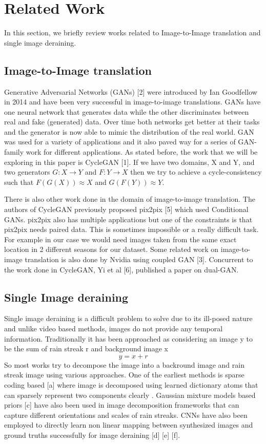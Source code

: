 \documentclass{article}
\begin{document}
\section{Related Work}
\label{gen_inst}

In this section, we briefly review works related to Image-to-Image translation and single image deraining.

\subsection{Image-to-Image translation}

Generative Adversarial Networks (GANs) [2] were introduced by  Ian Goodfellow in 2014 and have been very successful in image-to-image translations. GANs have one neural network that generates data while the other discriminates between real and fake (generated) data. Over time both networks get better at their tasks and the generator is now able to mimic the distribution of the real world. GAN was used for a variety of applications and it also paved way for a series of GAN-family work for different applications. As stated before, the work that we will be exploring in this paper is CycleGAN [1]. If we have two domains, X and Y, and two generators $G: X \rightarrow Y$ and $F: Y \rightarrow  X$ then we try to achieve a cycle-consistency such that $F(G(X)) \approx X$ and $G(F(Y)) \approx Y$.

There is also other work done in the domain of image-to-image translation. The authors of CycleGAN previously proposed pix2pix [5] which used Conditional GANs. pix2pix also has multiple applications but one of the constraints is that pix2pix needs paired data. This is sometimes impossible or a really difficult task. For example in our case we would need images taken from the same exact location in 2 different seasons for our dataset. Some related work on image-to-image translation is also done by Nvidia using coupled GAN [3]. Concurrent to the work done in CycleGAN, Yi et al [6], published a paper on dual-GAN.

\subsection{Single Image deraining}

Single image deraining is a difficult problem to solve due to its ill-posed nature and unlike video based methods, images do not provide any temporal information. Traditionally it has been approached as considering an image y to be the sum of rain streak r and background image x
$$y = x + r$$
So most works try to decompose the image into a backround image and rain streak image using various approaches. One of the earliest methods is sparse coding based [a] where image is decomposed using learned dictionary atoms that can sparsely represent two components clearly . Gaussian mixture models based priors [c] have also been used in image decomposition frameworks that can capture different orientations and scales of rain streaks. CNNs have also been employed to directly learn non linear mapping between synthesized images and ground truths successfully for image deraining [d] [e] [f].
\end{document}
